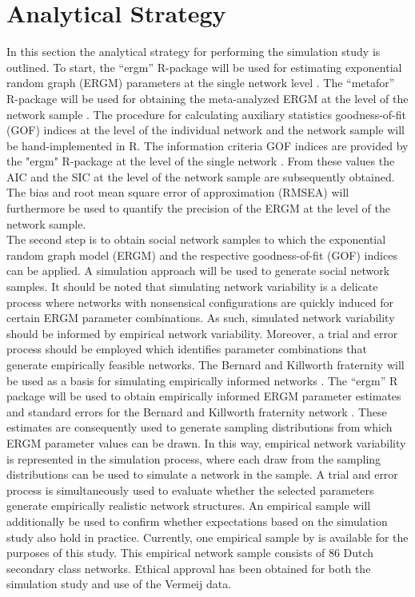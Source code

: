 \documentclass[a4paper, man, floatsintext]{apa6}
\begin{document}
\section{Analytical Strategy}
In this section the analytical strategy for performing the simulation study is outlined. To start, the “ergm” R-package will be used for estimating exponential random graph (ERGM) parameters at the single network level \cite{hunter2008ergm, team2013r}. The “metafor” R-package will be used for obtaining the meta-analyzed ERGM at the level of the network sample \cite{viechtbauer2010conducting, team2013r}. The procedure for calculating auxiliary statistics goodness-of-fit (GOF) indices at the level of the individual network and the network sample will be hand-implemented in R. \clearpage \noindent The information criteria GOF indices are provided by the "ergm" R-package at the level of the single network \cite{hunter2008ergm, team2013r}. From these values the AIC and the SIC at the level of the network sample are subsequently obtained.  The bias and root mean square error of approximation (RMSEA) will furthermore be used to quantify the precision of the ERGM at the level of the network sample.
\\
The second step is to obtain social network samples to which the exponential random graph model (ERGM) and the respective goodness-of-fit (GOF) indices can be applied. A simulation approach will be used to generate social network samples. It should be noted that simulating network variability is a delicate process where networks with nonsensical configurations are quickly induced for certain ERGM parameter combinations. As such, simulated network variability should be informed by empirical network variability. Moreover, a trial and error process should be employed which identifies parameter combinations that generate empirically feasible networks. The Bernard and Killworth fraternity will be used as a basis for simulating empirically informed networks \cite{bernard1980informant}. The “ergm” R package will be used to obtain empirically informed ERGM parameter estimates and standard errors for the Bernard and Killworth fraternity network \cite{hunter2008ergm, team2013r}. These estimates are consequently used to generate sampling distributions from which ERGM parameter values can be drawn. In this way, empirical network variability is represented in the simulation process, where each draw from the sampling distributions can be used to simulate a network in the sample. A trial and error process is simultaneously used to evaluate whether the selected parameters generate empirically realistic network structures. An empirical sample will additionally be used to confirm whether expectations based on the simulation study also hold in practice. Currently, one empirical sample by  is available for the purposes of this study. This empirical network sample consists of 86 Dutch secondary class networks. Ethical approval has been obtained for both the simulation study and use of the Vermeij data. 
\end{document}
